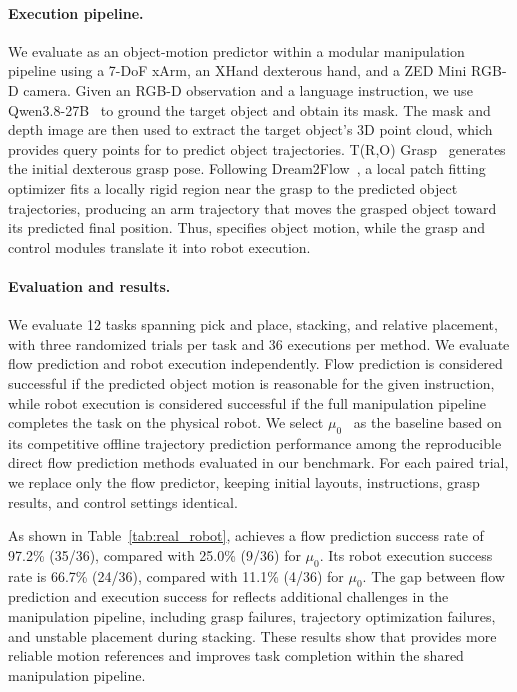 \paragraph{Execution pipeline.}
We evaluate \method{} as an object-motion predictor within
a modular manipulation pipeline using a 7-DoF xArm,
an XHand dexterous hand, and a ZED Mini RGB-D camera.
Given an RGB-D observation and a language instruction,
we use Qwen3.8-27B~\citep{qwen38} to ground the target object and
obtain its mask. The mask and depth image are then used
to extract the target object's 3D point cloud, which
provides query points for \method{} to predict object
trajectories.
T(R,O) Grasp~\citep{fei2025t} generates the initial
dexterous grasp pose. Following
Dream2Flow~\citep{dharmarajan2025dream2flow}, a local
patch fitting optimizer fits a locally rigid region
near the grasp to the predicted object trajectories,
producing an arm trajectory that moves the grasped
object toward its predicted final position.
Thus, \method{} specifies object motion, while the grasp
and control modules translate it into robot execution.

\paragraph{Evaluation and results.}
We evaluate 12 tasks spanning pick and place, stacking,
and relative placement, with three randomized trials
per task and 36 executions per method. We evaluate flow
prediction and robot execution independently. Flow
prediction is considered successful if the predicted
object motion is reasonable for the given instruction,
while robot execution is considered successful if the
full manipulation pipeline completes the task on the
physical robot.
We select $\mu_0$~\citep{lee2026mu_0} as the baseline
based on its competitive offline trajectory prediction
performance among the reproducible direct flow prediction
methods evaluated in our benchmark. For each paired
trial, we replace only the flow predictor, keeping
initial layouts, instructions, grasp results, and
control settings identical.

As shown in Table~\ref{tab:real_robot}, \method{} achieves
a flow prediction success rate of 97.2\% (35/36),
compared with 25.0\% (9/36) for $\mu_0$. Its robot
execution success rate is 66.7\% (24/36), compared with
11.1\% (4/36) for $\mu_0$. The gap between flow
prediction and execution success for \method{} reflects
additional challenges in the manipulation pipeline,
including grasp failures, trajectory optimization
failures, and unstable placement during stacking.
These results show that \method{} provides more reliable
motion references and improves task completion within
the shared manipulation pipeline.

